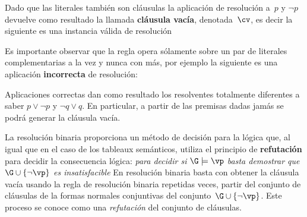 \documentclass[11pt,letterpaper]{article}
\begin{document}
Dado que las literales también son cláusulas la aplicación de resolución a~$p$ 
y $\neg p$ devuelve como resultado la llamada \textbf{cláusula vacía}, 
denotada~$\cv$, es decir la siguiente es una instancia válida de resolución
\begin{mathpar}
 \end{mathpar}
 
Es importante observar que la regla opera sólamente sobre un par de literales 
complementarias a la vez y nunca con más, por ejemplo la siguiente es
una aplicación \textbf{incorrecta} de resolución:
\begin{mathpar}
\end{mathpar}

Aplicaciones correctas dan como resultado los resolventes totalmente diferentes 
a saber $p\lor\neg p$ y $\neg q\lor q$. En particular, a partir de las premisas 
dadas jamás se podrá generar la cláusula vacía.

\espc

La resolución binaria proporciona un método de decisión para la lógica que, al 
igual que en el caso de los tableaux semánticos, utiliza el principio de 
\textbf{refutación} para decidir la consecuencia lógica:
\bc
\textit{para decidir si $\G\models\vp$ basta demostrar que $\G\cup\{\neg\vp\}$ 
es insatisfacible}
\ec
En resolución binaria basta con obtener la cláusula vacía usando la regla de 
resolución binaria repetidas veces, partir del conjunto de cláusulas de la 
formas normales conjuntivas del conjunto~$\G\cup\{\neg\vp\}$. 
Este proceso se conoce como una \textit{refutación} del conjunto de cláusulas.

\end{document}
